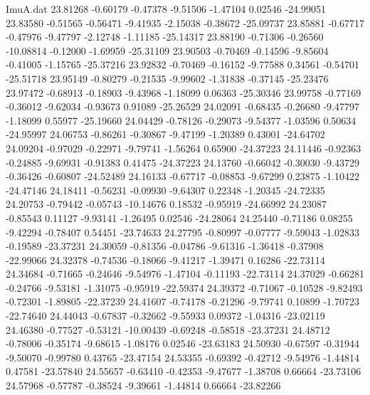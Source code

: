 \begin{filecontents}{ImuA.dat}
  23.81268   -0.60179   -0.47378   -9.51506   -1.47104    0.02546  -24.99051
  23.83580   -0.51565   -0.56471   -9.41935   -2.15038   -0.38672  -25.09737
  23.85881   -0.67717   -0.47976   -9.47797   -2.12748   -1.11185  -25.14317
  23.88190   -0.71306   -0.26560  -10.08814   -0.12000   -1.69959  -25.31109
  23.90503   -0.70469   -0.14596   -9.85604   -0.41005   -1.15765  -25.37216
  23.92832   -0.70469   -0.16152   -9.77588    0.34561   -0.54701  -25.51718
  23.95149   -0.80279   -0.21535   -9.99602   -1.31838   -0.37145  -25.23476
  23.97472   -0.68913   -0.18903   -9.43968   -1.18099    0.06363  -25.30346
  23.99758   -0.77169   -0.36012   -9.62034   -0.93673    0.91089  -25.26529
  24.02091   -0.68435   -0.26680   -9.47797   -1.18099    0.55977  -25.19660
  24.04429   -0.78126   -0.29073   -9.54377   -1.03596    0.50634  -24.95997
  24.06753   -0.86261   -0.30867   -9.47199   -1.20389    0.43001  -24.64702
  24.09204   -0.97029   -0.22971   -9.79741   -1.56264    0.65900  -24.37223
  24.11446   -0.92363   -0.24885   -9.69931   -0.91383    0.41475  -24.37223
  24.13760   -0.66042   -0.30030   -9.43729   -0.36426   -0.60807  -24.52489
  24.16133   -0.67717   -0.08853   -9.67299    0.23875   -1.10422  -24.47146
  24.18411   -0.56231   -0.09930   -9.64307    0.22348   -1.20345  -24.72335
  24.20753   -0.79442   -0.05743  -10.14676    0.18532   -0.95919  -24.66992
  24.23087   -0.85543    0.11127   -9.93141   -1.26495    0.02546  -24.28064
  24.25440   -0.71186    0.08255   -9.42294   -0.78407    0.54451  -23.74633
  24.27795   -0.80997   -0.07777   -9.59043   -1.02833   -0.19589  -23.37231
  24.30059   -0.81356   -0.04786   -9.61316   -1.36418   -0.37908  -22.99066
  24.32378   -0.74536   -0.18066   -9.41217   -1.39471    0.16286  -22.73114
  24.34684   -0.71665   -0.24646   -9.54976   -1.47104   -0.11193  -22.73114
  24.37029   -0.66281   -0.24766   -9.53181   -1.31075   -0.95919  -22.59374
  24.39372   -0.71067   -0.10528   -9.82493   -0.72301   -1.89805  -22.37239
  24.41607   -0.74178   -0.21296   -9.79741    0.10899   -1.70723  -22.74640
  24.44043   -0.67837   -0.32662   -9.55933    0.09372   -1.04316  -23.02119
  24.46380   -0.77527   -0.53121  -10.00439   -0.69248   -0.58518  -23.37231
  24.48712   -0.78006   -0.35174   -9.68615   -1.08176    0.02546  -23.63183
  24.50930   -0.67597   -0.31944   -9.50070   -0.99780    0.43765  -23.47154
  24.53355   -0.69392   -0.42712   -9.54976   -1.44814    0.47581  -23.57840
  24.55657   -0.63410   -0.42353   -9.47677   -1.38708    0.66664  -23.73106
  24.57968   -0.57787   -0.38524   -9.39661   -1.44814    0.66664  -23.82266

\end{filecontents}
